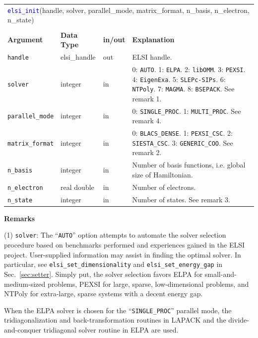\documentclass{report}
\newcommand{\api}[1]{\textcolor{blue}{\texttt{#1}}}
\begin{document}
\begin{tabular}[]{|p{25mm}|p{20mm}|p{10mm}|p{107mm}|}
\multicolumn{4}{l}{\api{elsi\_init}(handle, solver, parallel\_mode, matrix\_format, n\_basis, n\_electron, n\_state)}\\
\multicolumn{4}{l}{}\\
\hline
\multicolumn{1}{|l|}{\textbf{Argument}} & \multicolumn{1}{l|}{\textbf{Data Type}} & \multicolumn{1}{l|}{\textbf{in/out}} & \multicolumn{1}{l|}{\textbf{Explanation}}\\
\hline
\texttt{handle}         & elsi\_handle & out & ELSI handle.\\
\hline
\texttt{solver}         & integer      & in  & 0: \texttt{AUTO}. 1: \texttt{ELPA}. 2: \texttt{libOMM}. 3: \texttt{PEXSI}. 4: \texttt{EigenExa}. 5: \texttt{SLEPc-SIPs}. 6: \texttt{NTPoly}. 7: \texttt{MAGMA}. 8: \texttt{BSEPACK}. See remark 1.\\
\hline
\texttt{parallel\_mode} & integer      & in  & 0: \texttt{SINGLE\_PROC}. 1: \texttt{MULTI\_PROC}. See remark 4.\\
\hline
\texttt{matrix\_format} & integer      & in  & 0: \texttt{BLACS\_DENSE}. 1: \texttt{PEXSI\_CSC}. 2: \texttt{SIESTA\_CSC}. 3: \texttt{GENERIC\_COO}. See remark 2.\\
\hline
\texttt{n\_basis}       & integer      & in  & Number of basis functions, i.e. global size of Hamiltonian.\\
\hline
\texttt{n\_electron}    & real double  & in  & Number of electrons.\\
\hline
\texttt{n\_state}       & integer      & in  & Number of states. See remark 3.\\
\hline
\end{tabular}

\textbf{Remarks}

(1) \texttt{solver}: The ``\texttt{AUTO}'' option attempts to automate the solver selection procedure based on benchmarks performed and experiences gained in the ELSI project. User-supplied information may assist in finding the optimal solver. In particular, see \texttt{elsi\_set\_dimensionality} and \texttt{elsi\_set\_energy\_gap} in Sec.~\ref{sec:setter}. Simply put, the solver selection favors ELPA for small-and-medium-sized problems, PEXSI for large, sparse, low-dimensional problems, and NTPoly for extra-large, sparse systems with a decent energy gap.

When the ELPA solver is chosen for the ``\texttt{SINGLE\_PROC}'' parallel mode, the tridiagonalization and back-transformation routines in LAPACK and the divide-and-conquer tridiagonal solver routine in ELPA are used.
\end{document}
